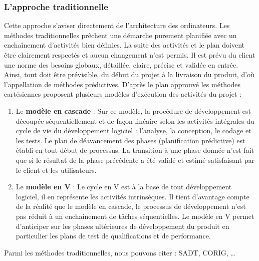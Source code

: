 \subsubsection{L'approche traditionnelle}
Cette approche s’aviser directement de l’architecture des ordinateurs. Les méthodes traditionnelles prêchent une démarche purement planifiée avec un enchaînement d'activités bien définies. La suite des activités et le plan doivent être clairement respectés et aucun changement n’est permis. Il est prévu du client une norme des besoins globaux, détaillée, claire, précise et validée en entrée. Ainsi, tout doit être prévisible, du début du projet à la livraison du produit, d’où l’appellation de méthodes prédictives. \newline
D'après le plan approuvé les méthodes cartésiennes proposent plusieurs modèles d’exécution des activités du projet :
\begin{enumerate}
	\item Le \textbf{modèle en cascade} : Sur ce modèle, la procédure de développement est découpée séquentiellement et de façon linéaire selon les activités intégrales du cycle de vie du développement logiciel : l’analyse, la conception, le codage et les tests. Le plan de déavancement des phases (planification prédictive) est établi en tout début de processus. La transition à une phase donnée n’est fait que si le résultat de la phase précédente a été validé et estimé satisfaisant par le client et les utilisateurs.
	\item Le \textbf{modèle en V} : Le cycle en V est à la base de tout développement logiciel, il en représente les activités intrinsèques. Il tient d'avantage compte de la réalité que le modèle en cascade, le processus de développement n’est pas réduit à un enchainement de tâches séquentielles. Le modèle en V permet d’anticiper sur les phases ultérieures de développement du produit en particulier les plans de test de qualifications et de performance.
\end{enumerate}
Parmi les méthodes traditionnelles, nous pouvons citer : SADT, CORIG, …
